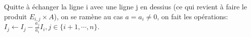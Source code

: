 \documentclass[a4paper, 12pt]{article}
\begin{document}
\begin{demonstration}
    Quitte à échanger la ligne i avec une ligne j en dessius (ce qui revient à faire le produit $E_{i,j} \times A$),
    on se ramène au cas $a = a_i \neq 0$, on fait les opérations:
    $I_j \leftarrow I_j - \frac{a_j}{a_i}I_i, j \in \{i + 1, \cdots, n\}$.

\end{demonstration}

\end{document}
